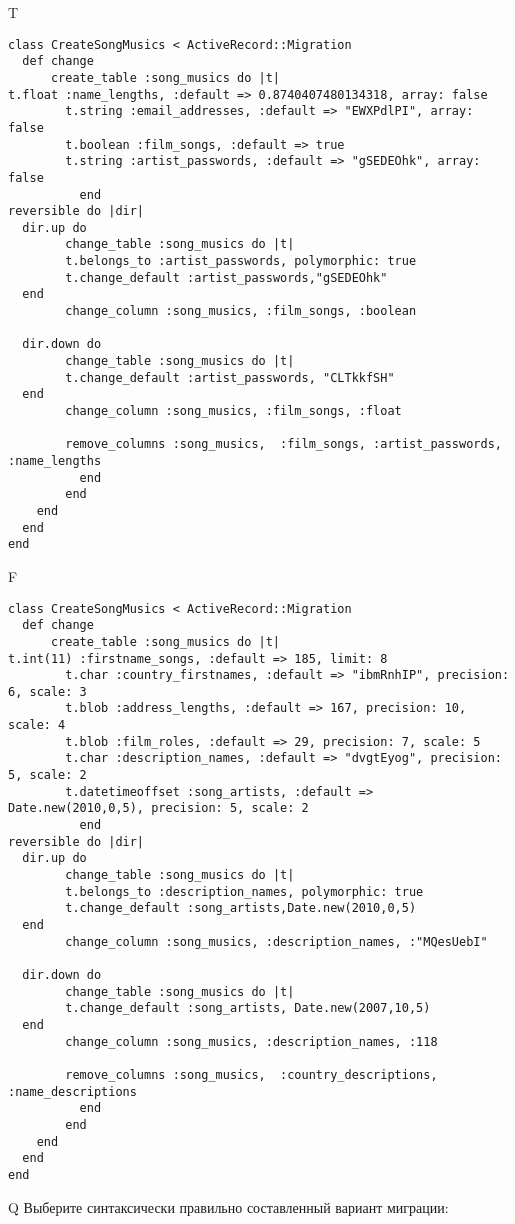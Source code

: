 T
\begin{verbatim}
class CreateSongMusics < ActiveRecord::Migration
  def change
	  create_table :song_musics do |t|
t.float :name_lengths, :default => 0.8740407480134318, array: false
		t.string :email_addresses, :default => "EWXPdlPI", array: false
		t.boolean :film_songs, :default => true
		t.string :artist_passwords, :default => "gSEDEOhk", array: false
		  end
reversible do |dir|
  dir.up do
		change_table :song_musics do |t|
		t.belongs_to :artist_passwords, polymorphic: true
 		t.change_default :artist_passwords,"gSEDEOhk"
  end
 		change_column :song_musics, :film_songs, :boolean
   
  dir.down do
		change_table :song_musics do |t|
		t.change_default :artist_passwords, "CLTkkfSH"
  end
 		change_column :song_musics, :film_songs, :float
   
		remove_columns :song_musics,  :film_songs, :artist_passwords, :name_lengths 
	      end
	    end
    end 
  end
end

\end{verbatim}

F
\begin{verbatim}
class CreateSongMusics < ActiveRecord::Migration
  def change
	  create_table :song_musics do |t|
t.int(11) :firstname_songs, :default => 185, limit: 8
		t.char :country_firstnames, :default => "ibmRnhIP", precision: 6, scale: 3
		t.blob :address_lengths, :default => 167, precision: 10, scale: 4
		t.blob :film_roles, :default => 29, precision: 7, scale: 5
		t.char :description_names, :default => "dvgtEyog", precision: 5, scale: 2
		t.datetimeoffset :song_artists, :default => Date.new(2010,0,5), precision: 5, scale: 2
		  end
reversible do |dir|
  dir.up do
		change_table :song_musics do |t|
		t.belongs_to :description_names, polymorphic: true
 		t.change_default :song_artists,Date.new(2010,0,5)
  end
 		change_column :song_musics, :description_names, :"MQesUebI"
   
  dir.down do
		change_table :song_musics do |t|
		t.change_default :song_artists, Date.new(2007,10,5)
  end
 		change_column :song_musics, :description_names, :118
   
		remove_columns :song_musics,  :country_descriptions, :name_descriptions 
	      end
	    end
    end 
  end
end

\end{verbatim}

Q
Выберите синтаксически правильно составленный вариант миграции:

